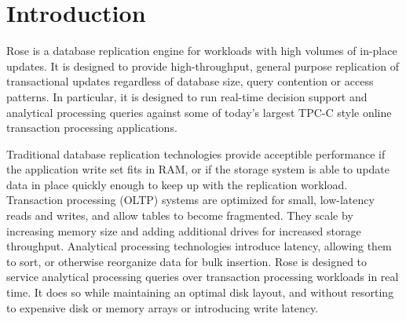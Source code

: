 \documentclass{vldb}
\newcommand{\rows}{Rose\xspace}
\newcommand{\rowss}{Rose's\xspace}
\begin{document}
\begin{abstract}
\rowss throughput is limited by sequential I/O bandwidth.  We use
column compression to reduce this bottleneck.  Rather than reassemble
rows from a column-oriented disk layout, we adapt existing column
compression algorithms to a simple row-oriented data layout.  This
approach to database compression introduces negligible space overhead
and can be applied to most single-pass, randomly accessible
compression formats.  Our prototype uses lightweight (superscalar)
column compression algorithms.

Existing analytical models and our hybrid of the TPC-C and TPC-H
benchmarks reveal that, for applications with write sets larger than
RAM, \rows provides orders of magnitude greater throughput than
conventional replication techniques.

\end{abstract}





\section{Introduction}

\rows is a database replication engine for workloads with high volumes
of in-place updates.  It is designed to provide high-throughput,
general purpose replication of transactional updates regardless of
database size, query contention or access patterns.  In particular, it
is designed to run real-time decision support and analytical
processing queries against some of today's largest TPC-C style online
transaction processing applications.

Traditional database replication technologies provide acceptible
performance if the application write set fits in RAM, or if the
storage system is able to update data in place quickly enough to keep
up with the replication workload.  Transaction processing (OLTP)
systems are optimized for small, low-latency reads and writes, and allow tables to become fragmented.  They scale by
increasing memory size and adding additional drives for increased
storage throughput.  Analytical processing technologies introduce
latency, allowing them to sort, or otherwise reorganize data for bulk
insertion.  \rows is designed to service analytical processing queries
over transaction processing workloads in real time.  It does so
while maintaining an optimal disk layout, and without resorting to
expensive disk or memory arrays or introducing write latency.
\end{document}
